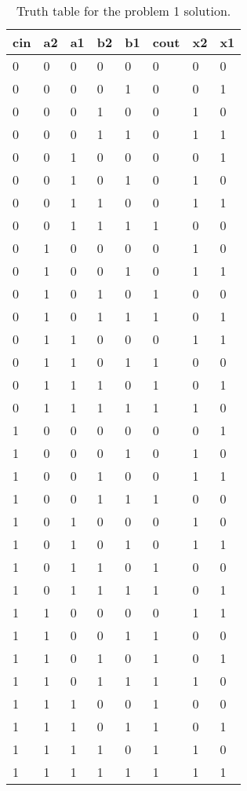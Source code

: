 \documentclass[11pt]{article}
\begin{document}
\begin{table}[H]
\begin{center}
	\begin{tabular}{| l | l | l | l | l | l | l | l |}
		\hline
		cin & a2 & a1 & b2 & b1 & cout & x2 & x1 \\ \hline
		0 & 0 & 0 & 0 & 0 & 0 & 0 & 0 \\ \hline
		0 & 0 & 0 & 0 & 1 & 0 & 0 & 1 \\ \hline
		0 & 0 & 0 & 1 & 0 & 0 & 1 & 0 \\ \hline
		0 & 0 & 0 & 1 & 1 & 0 & 1 & 1 \\ \hline
		0 & 0 & 1 & 0 & 0 & 0 & 0 & 1 \\ \hline
		0 & 0 & 1 & 0 & 1 & 0 & 1 & 0 \\ \hline
		0 & 0 & 1 & 1 & 0 & 0 & 1 & 1 \\ \hline
		0 & 0 & 1 & 1 & 1 & 1 & 0 & 0 \\ \hline
		0 & 1 & 0 & 0 & 0 & 0 & 1 & 0 \\ \hline
		0 & 1 & 0 & 0 & 1 & 0 & 1 & 1 \\ \hline
		0 & 1 & 0 & 1 & 0 & 1 & 0 & 0 \\ \hline
		0 & 1 & 0 & 1 & 1 & 1 & 0 & 1 \\ \hline
		0 & 1 & 1 & 0 & 0 & 0 & 1 & 1 \\ \hline
		0 & 1 & 1 & 0 & 1 & 1 & 0 & 0 \\ \hline
		0 & 1 & 1 & 1 & 0 & 1 & 0 & 1 \\ \hline
		0 & 1 & 1 & 1 & 1 & 1 & 1 & 0 \\ \hline
		1 & 0 & 0 & 0 & 0 & 0 & 0 & 1 \\ \hline
		1 & 0 & 0 & 0 & 1 & 0 & 1 & 0 \\ \hline
		1 & 0 & 0 & 1 & 0 & 0 & 1 & 1 \\ \hline
		1 & 0 & 0 & 1 & 1 & 1 & 0 & 0 \\ \hline
		1 & 0 & 1 & 0 & 0 & 0 & 1 & 0 \\ \hline
		1 & 0 & 1 & 0 & 1 & 0 & 1 & 1 \\ \hline
		1 & 0 & 1 & 1 & 0 & 1 & 0 & 0 \\ \hline
		1 & 0 & 1 & 1 & 1 & 1 & 0 & 1 \\ \hline
		1 & 1 & 0 & 0 & 0 & 0 & 1 & 1 \\ \hline
		1 & 1 & 0 & 0 & 1 & 1 & 0 & 0 \\ \hline
		1 & 1 & 0 & 1 & 0 & 1 & 0 & 1 \\ \hline
		1 & 1 & 0 & 1 & 1 & 1 & 1 & 0 \\ \hline
		1 & 1 & 1 & 0 & 0 & 1 & 0 & 0 \\ \hline
		1 & 1 & 1 & 0 & 1 & 1 & 0 & 1 \\ \hline
		1 & 1 & 1 & 1 & 0 & 1 & 1 & 0 \\ \hline
		1 & 1 & 1 & 1 & 1 & 1 & 1 & 1 \\ \hline
	\end{tabular}
	\caption{\label{tab:stupidlyLongSlicerTruthTable}Truth table for the problem 1 solution.}
\end{center}
\end{table}
\end{document}
